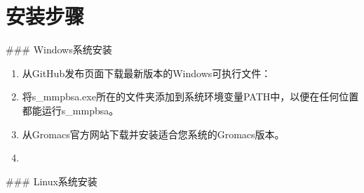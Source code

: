 \documentclass[letterpaper,10pt,english]{sphinxmanual}
\begin{document}
\section{安装步骤}
\label{\detokenize{installation:id4}}
\sphinxAtStartPar
\#\#\# Windows系统安装
\begin{enumerate}
%
\item {} 
\sphinxAtStartPar
{}

\sphinxAtStartPar
从GitHub发布页面下载最新版本的Windows可执行文件：

\begin{sphinxVerbatim}[commandchars=\\\{\}]
\end{sphinxVerbatim}

\item {} 
\sphinxAtStartPar
{}

\sphinxAtStartPar
将s\_mmpbsa.exe所在的文件夹添加到系统环境变量PATH中，以便在任何位置都能运行s\_mmpbsa。

\item {} 
\sphinxAtStartPar
{}

\sphinxAtStartPar
从Gromacs官方网站下载并安装适合您系统的Gromacs版本。

\item {} 
\sphinxAtStartPar
{}

\begin{sphinxVerbatim}[commandchars=\\\{\}]
  
\end{sphinxVerbatim}

\end{enumerate}

\sphinxAtStartPar
\#\#\# Linux系统安装
\end{document}

